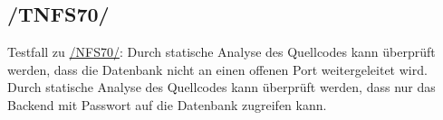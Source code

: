 \subsection*{/TNFS70/}

\label{/TNFS70/} Testfall zu \hyperref[/NFS70/]{/NFS70/}: Durch \gls{statische Analyse} des \Gls{Quellcode}s kann überprüft werden, dass die \Gls{Datenbank} nicht an einen offenen \Gls{Port} weitergeleitet wird.
Durch \gls{statische Analyse} des \Gls{Quellcode}s kann überprüft werden, dass nur das \Gls{Backend} mit Passwort auf die \Gls{Datenbank} zugreifen kann.
